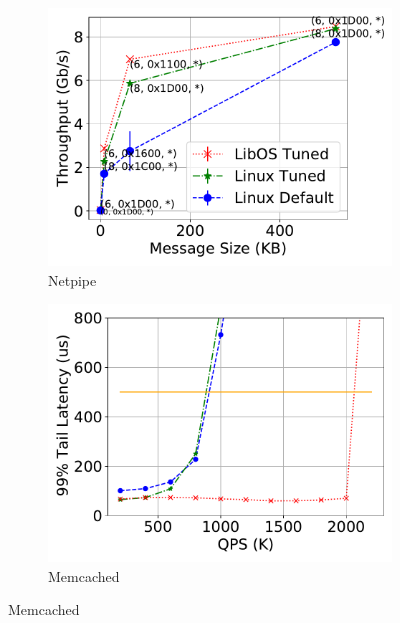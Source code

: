       \begin{figure}
        \centering
        \begin{subfigure}[b]{0.34\textwidth}
            \centering
            \caption[]%
            {{\small Netpipe}}  
            \vspace*{-0.3cm}  
            \label{fig:perf_netpipe}
            \includegraphics[width=1\textwidth]{osdi_figures/netpipe_tput}
        \end{subfigure}
        \begin{subfigure}[b]{0.32\textwidth}  
            \centering 
            \caption[]%
            {{\small Memcached}} 
            \vspace*{-0.3cm}    
            \label{fig:perf_mcd}
            \includegraphics[width=1\textwidth]{osdi_figures/mcd_sla.pdf}

\end{subfigure}
\end{figure}
